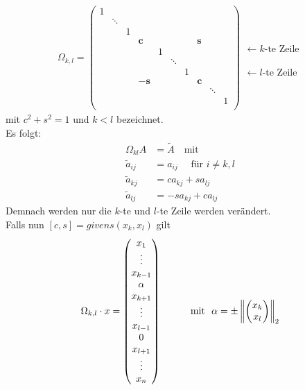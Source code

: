 \begin{gather}
  \Omega _{k,l} = \begin{pmatrix}
    1 &&&&&&&&& \\
    & \ddots\\
    && 1\\
    &&& \mathbf{c} &&&& \mathbf{s} \\
    &&&& 1\\
    &&&&& \ddots \\
    &&&&&& 1\\
    &&& -\mathbf{s} &&&& \mathbf{c} \\
    &&&&&&&& \ddots \\
    &&&&&&&&& 1\\
  \end{pmatrix}
  \begin{array}{l}
    \\   \leftarrow \text{$k$-te Zeile}
    \\ \\ \\ \\ \leftarrow \text{$l$-te Zeile}
  \end{array}
  \label{IV.4.5}
\end{gather}
mit $c^2+s^2=1$ und $k<l$ bezeichnet.\\
Es folgt:
\begin{align*}
  \Omega_{kl} A &= \widetilde{A} \quad \text{mit} \\
  \widetilde{a}_{ij}  &= a_{ij} \quad \text{ für } i\neq k,l \\
  \widetilde{a}_{kj} & = ca_{kj}+sa_{lj} \\
  \widetilde{a}_{lj} & = -sa_{kj} + ca_{lj}
\end{align*}
Demnach werden nur die $k$-te und $l$-te Zeile werden verändert. \\
Falls nun $[c,s] = givens(x_k, x_l)$ gilt
\begin{gather}
  \Omega_{k,l}\cdot x = \begin{pmatrix}
    x_1 \\ \vdots \\x_{k-1} \\\alpha \\ x_{k+1}
    \\\vdots \\
    x_{l-1} \\ 0 \\x_{l+1} \\\vdots \\x_n
  \end{pmatrix}
  \qquad
  \quad \text{mit~~}
  \alpha = \pm \left\|   \begin{pmatrix} x_k \\ x_l\end{pmatrix} \right\|_2
  \label{IV.4.6}
\end{gather}
